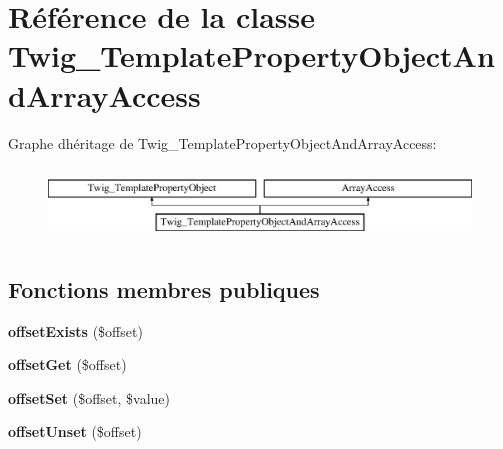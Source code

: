 \hypertarget{class_twig___template_property_object_and_array_access}{}\section{Référence de la classe Twig\+\_\+\+Template\+Property\+Object\+And\+Array\+Access}
\label{class_twig___template_property_object_and_array_access}
Graphe d\textquotesingle{}héritage de Twig\+\_\+\+Template\+Property\+Object\+And\+Array\+Access\+:\begin{figure}[H]
\begin{center}
\leavevmode
\includegraphics[height=1.951219cm]{class_twig___template_property_object_and_array_access}
\end{center}
\end{figure}
\subsection*{Fonctions membres publiques}
\begin{DoxyCompactItemize}
\item 
{\bfseries offset\+Exists} (\$offset)\hypertarget{class_twig___template_property_object_and_array_access_a24ff257ec0c2221bc6fd7b1b4388e26e}{}\label{class_twig___template_property_object_and_array_access_a24ff257ec0c2221bc6fd7b1b4388e26e}

\item 
{\bfseries offset\+Get} (\$offset)\hypertarget{class_twig___template_property_object_and_array_access_a59aee6e89465b48f014699f41b521f87}{}\label{class_twig___template_property_object_and_array_access_a59aee6e89465b48f014699f41b521f87}

\item 
{\bfseries offset\+Set} (\$offset, \$value)\hypertarget{class_twig___template_property_object_and_array_access_ac6bde6b1eb50eb5377e91771fe46b7a3}{}\label{class_twig___template_property_object_and_array_access_ac6bde6b1eb50eb5377e91771fe46b7a3}

\item 
{\bfseries offset\+Unset} (\$offset)\hypertarget{class_twig___template_property_object_and_array_access_a2411227ea7118b13495de9839fd4b563}{}\label{class_twig___template_property_object_and_array_access_a2411227ea7118b13495de9839fd4b563}

\end{DoxyCompactItemize}
